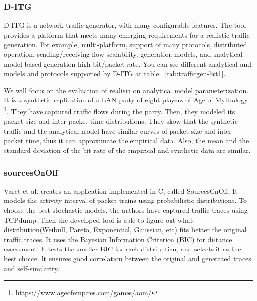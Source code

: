 \subsubsection{D-ITG}

D-ITG\cite{ditg-paper} is a network traffic generator, with many configurable features. The tool provides a platform that meets many emerging requirements for a realistic traffic generation. For example, multi-platform, support of many protocols, distributed operation, sending/receiving flow scalability, generation models, and analytical model based generation high bit/packet rate. You can see different analytical and models and protocols supported by D-ITG at table ~\ref{tab:trafficgen-list1}. 

We will focus on the evaluation of realism on analytical model parameterization.  It is a synthetic replication of a LAN party of eight players of Age of Mythology \footnote{\href{https://www.ageofempires.com/games/aom/}{https://www.ageofempires.com/games/aom/}}. They have captured traffic flows during the party. Then, they modeled its packet size and inter-packet time distributions. They show that the synthetic traffic and the analytical model have similar curves of packet size and inter-packet time, thus it can approximate the empirical data. Also, the mean and the standard deviation of the bit rate of the empirical and synthetic data are similar. 


\subsubsection{sourcesOnOff}


Varet et al. \cite{sourcesonoff-paper} creates an application implemented in C, called SourcesOnOff. It models the activity interval of packet trains using probabilistic distributions. To choose the best stochastic models, the authors have captured traffic traces using TCPdump. Then the developed tool is able to figure out what distribution(Weibull, Pareto, Exponential, Gaussian, etc) fits better the original traffic traces. It uses the Bayesian Information Criterion (BIC) for distance assessment. It tests the smaller BIC for each distribution, and selects it as the best choice. It ensures good correlation between the original and generated traces and self-similarity.

